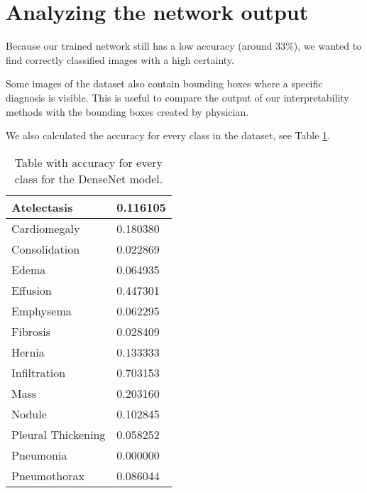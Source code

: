 \section{Analyzing the network output}
Because our trained network still has a low accuracy (around 33\%), we wanted to find correctly classified images with a high certainty.

Some images of the dataset also contain bounding boxes where a specific diagnosis is visible. This is useful to compare the output
of our interpretability methods with the bounding boxes created by physician.


We also calculated the accuracy for every class in the dataset, see Table \ref{chestxrayaccuracy}.

\begin{table}[H]
\begin{center}
\begin{tabular}{ | l | l | }
\hline
Atelectasis & 0.116105 \\ \hline
Cardiomegaly & 0.180380 \\ \hline
Consolidation & 0.022869 \\ \hline
Edema & 0.064935 \\ \hline
Effusion & 0.447301 \\ \hline
Emphysema & 0.062295 \\ \hline
Fibrosis & 0.028409 \\ \hline
Hernia & 0.133333 \\ \hline
Infiltration & 0.703153 \\ \hline
Mass & 0.203160 \\ \hline
Nodule & 0.102845 \\ \hline
Pleural Thickening & 0.058252 \\ \hline
Pneumonia & 0.000000 \\ \hline
Pneumothorax & 0.086044 \\
\hline
\end{tabular}
\caption{Table with accuracy for every class for the DenseNet model.}
\label{chestxrayaccuracy}
\end{center}
\end {table}
